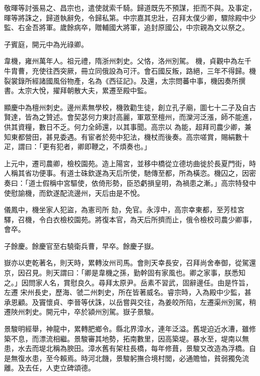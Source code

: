 \begin{pinyinscope}
 敬暉等討張易之、昌宗也，遣使就索千騎。歸道既先不預謀，拒而不與。及事定，暉等將誅之，歸道執辭免，令歸私第。中宗嘉其忠壯，召拜太僕少卿，驟除殿中少監、右金吾將軍。歲餘病卒，贈輔國大將軍，追封原國公，中宗親為文以祭之。



 子賓庭，開元中為光祿卿。



 韋機，雍州萬年人。祖元禮，隋浙州刺史。父恪，洛州別駕。
 機，貞觀中為左千牛胄曹，充使往西突厥，冊立同俄設為可汗。會石國反叛，路絕，三年不得歸。機裂裳錄所經諸國風俗物產，名為《西征記》。及還，太宗問蕃中事，機因奏所撰書。太宗大悅，擢拜朝散大夫，累遷至殿中監。



 顯慶中為檀州刺史。邊州素無學校，機敦勸生徒，創立孔子廟，圖七十二子及自古賢達，皆為之贊述。會契苾何力東討高麗，軍眾至檀州，而灤河泛漲，師不能進，供其資糧，數日不乏。何力全師還，以其事聞。高宗以
 為能，超拜司農少卿，兼知東都營田，甚見委遇。有宦者於苑中犯法，機杖而後奏。高宗嗟賞，賜絹數十疋，謂曰：「更有犯者，卿即鞭之，不煩奏也。」



 上元中，遷司農卿，檢校園苑。造上陽宮，並移中橋從立德坊曲徙於長夏門街，時人稱其省功便事。有道士硃欽遂為天后所使，馳傳至都，所為橫恣。機囚之，因密奏曰：「道士假稱中宮驅使，依倚形勢，臣恐虧損皇明，為禍患之漸。」高宗特發中使慰諭機，而欽遂配流邊州，天后由是不悅。



 儀鳳中，機坐家人犯盜，為憲司所
 劾，免官。永淳中，高宗幸東都，至芳桂宮驛，召機，令白衣檢校園苑。將復本官，為天后所擠而止，俄令檢校司農少卿事，會卒。



 子餘慶。餘慶官至右驍衛兵曹，早卒。餘慶子嶽。



 嶽亦以吏乾著名，則天時，累轉汝州司馬。會則天幸長安，召拜尚舍奉御，從駕還京，因召見。則天謂曰：「卿是韋機之孫，勤幹固有家風也。卿之家事，朕悉知之。」因問家人名，賞慰良久。尋拜太原尹。岳素不習武，固辭邊任。由是忤旨，左遷
 宋州長史，歷海、虢二州刺史，所在皆著威名。睿宗時，入為殿中少監，甚承恩顧。及竇懷貞、李晉等伏誅，以岳嘗與交往，為姜皎所陷，左遷渠州別駕，稍遷陜州刺史。開元中，卒於潁州別駕。嶽子景駿。



 景駿明經舉，神龍中，累轉肥鄉令。縣北界漳水，連年泛溢。舊堤迫近水漕，雖修築不息，而漂流相繼。景駿審其地勢，拓南數里，因高築堤。暴水至，堤南以無患，水去而堤北稱為腴田。漳水舊有架柱長橋，每年修葺，景駿又改造為浮橋。自是無復水患，至今賴焉。時河北饑，景駿躬撫合境村閭，必通贍恤，貧弱獨免流離。及去任，人吏立碑頌德。




\end{pinyinscope}
